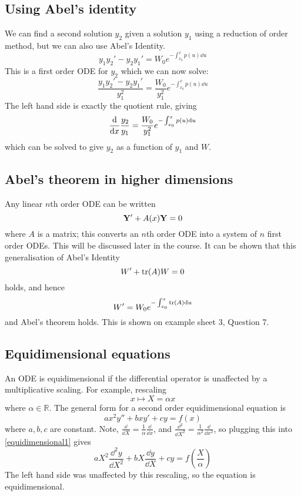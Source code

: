 \subsection{Using Abel's identity}
We can find a second solution \(y_2\) given a solution \(y_1\) using a reduction of order method, but we can also use Abel's Identity.
\[
	y_1y_2' - y_2y_1' = W_0 e^{-\int_{x_0}^x p(u) \dd{u}}
\]
This is a first order ODE for \(y_2\) which we can now solve:
\[
	\frac{y_1y_2' - y_2y_1'}{y_1^2} =  \frac{W_0}{y_1^2} e^{-\int_{x_0}^x p(u) \dd{u}}
\]
The left hand side is exactly the quotient rule, giving
\[
	\dv{x}\frac{y_2}{y_1} = \frac{W_0}{y_1^2} e^{-\int_{x_0}^x p(u) \dd{u}}
\]
which can be solved to give \(y_2\) as a function of \(y_1\) and \(W\).

\subsection{Abel's theorem in higher dimensions}
Any linear \(n\)th order ODE can be written
\[
	\vb Y' + A(x) \vb Y = 0
\]
where \(A\) is a matrix; this converts an \(n\)th order ODE into a system of \(n\) first order ODEs.
This will be discussed later in the course.
It can be shown that this generalisation of Abel's Identity
\[
	W' + \tr(A)W = 0
\]
holds, and hence
\[
	W' = W_0e^{-\int_{x_0}^x \tr(A) \dd{u}}
\]
and Abel's theorem holds.
This is shown on example sheet 3, Question 7.

\subsection{Equidimensional equations}
An ODE is equidimensional if the differential operator is unaffected by a multiplicative scaling.
For example, rescaling
\[
	x \mapsto X = \alpha x
\]
where \(\alpha \in \mathbb R\).
The general form for a second order equidimensional equation is
\begin{equation}\label{equidimensional1}
	ax^2 y'' + bxy' + cy = f(x)
\end{equation}
where \(a, b, c\) are constant.
Note, \(\frac{\dd}{\dd{X}} = \frac{1}{\alpha}\frac{\dd}{\dd{x}}\), and \(\frac{\dd^2}{\dd{X}^2} = \frac{1}{\alpha^2}\frac{\dd}{\dd{x}^2}\), so plugging this into \eqref{equidimensional1} gives
\[
	aX^2\frac{\dd^2 y}{\dd{X}^2} + bX\frac{\dd{y}}{\dd{X}} + cy = f\left(\frac{X}{\alpha}\right)
\]
The left hand side was unaffected by this rescaling, so the equation is equidimensional.

